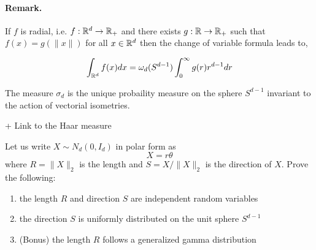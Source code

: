 \documentclass{article}
\begin{document}
\paragraph{Remark.} If $f$ is radial, i.e. $f: \mathbb{R}^{d}\to \mathbb{R}_+$ and there exists $g: \mathbb{R}
\to \mathbb{R}_+$ such that $f(x) = g(\|x\|)$ for all $x \in \mathbb{R}^{d}$ then the change of
variable formula leads to,

\begin{equation}
  \int_{\mathbb{R}^{d}} f(x) d x= \omega_d(S^{d-1})\int_{0}^{\infty} g(r)r^{d-1} d r
\end{equation}

\begin{prop}
  The measure $\sigma_{d}$ is the unique probaility measure on the sphere
  $S^{d-1}$ invariant to the action of vectorial isometries.
\end{prop}

+ Link to the Haar measure

\begin{prop} Let
  us write $X \sim N_d\left(0, I_{d}\right)$ in polar form as
  $$
  X=r \theta
  $$
  where $R=\|X\|_{2}$ is the length and $S=X /\|X\|_{2}$ is the direction
  of $X$. Prove the following:

  \begin{enumerate}
  \item the length $R$ and direction $S$ are independent random variables
  \item the direction $S$ is uniformly distributed on the unit sphere
    $S^{d-1}$
  \item (Bonus) the length $R$ follows a generalized gamma distribution
  \end{enumerate}
\end{prop}
\end{document}
